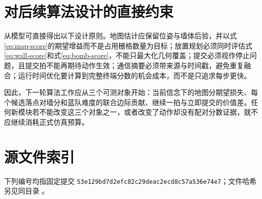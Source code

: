 \documentclass[UTF8,11pt]{ctexart}
\begin{document}
\section{对后续算法设计的直接约束}

从模型可直接得出以下设计原则。地图估计应保留位姿与墙体后验，并以式\eqref{eq:map-score}的期望增益而不是占用栅格数量为目标；放置规划必须同时评估式\eqref{eq:wall-score}和式\eqref{eq:bomb-score}，不能只最大化几何覆盖；提交必须视作停止问题，且提交拍不能再期待动作生效；通信摘要必须带来源与时间戳，避免重复融合；运行时间优化要计算到完整终端分数的机会成本，而不是只追求每步更快。

因此，下一轮算法工作应从三个可测对象开始：当前信念下的地图分期望损失、每个候选落点对墙分和蓝队难度的联合边际贡献、继续一拍与立即提交的价值差。任何新模块若不能改变这三个对象之一，或者改变了动作却没有配对分数证据，就不应继续消耗正式仿真预算。

\section{源文件索引}

下列编号均指固定提交 \texttt{53e129bd7d2efc82c29deac2ecd8c57a536e74e7}；文件哈希另见同目录 。
\end{document}
